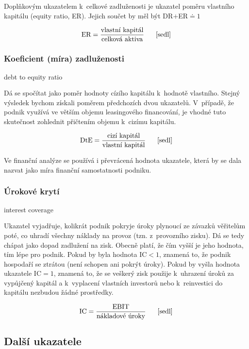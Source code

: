 \vspace{3mm}
Doplňkovým ukazatelem k~celkové zadluženosti je ukazatel poměru vlastního kapitálu (equity ratio, ER). Jejich součet by měl být DR$+$ER$
\doteq 1$

$$\vz{ER}{vlastní kapitál}{celková aktiva} \scite{sedl}$$

\subsubsection{Koeficient (míra) zadluženosti}
debt to equity ratio

Dá se spočítat jako poměr hodnoty cízího kapitálu k~hodnotě vlastního. Stejný výsledek bychom získali poměrem předchozích dvou ukazatelů. V~případě, že podnik využívá ve větším objemu leasingového financování, je vhodné tuto skutečnost zohlednit přičtením objemu k~cizímu kapitálu. 

$$\vz{DtE}{cizí kapitál}{vlastní kapitál} \scite{sedl}$$

\vspace{3mm}
Ve finanční analýze se používá i převrácená hodnota ukazatele, která by se dala nazvat jako míra finanční samostatnosti podniku.

\subsubsection{Úrokové krytí}
interest coverage

Ukazatel vyjadřuje, kolikrát podnik pokryje úroky plynoucí ze závazků věřitelům poté, co uhradí všechny náklady na provoz (tzn. z~provozního zisku). Dá se tedy chápat jako dopad zadlužení na zisk. Obecně platí, že čím vyšší je jeho hodnota, tím lépe pro podnik. Pokud by byla hodnota IC$<1$, znamená to, že podnik hospodaří se ztrátou (není schopen ani pokrýt úroky). Pokud by vyšla hodnota ukazatele IC$=1$, znamená to, že se veškerý zisk použije k~uhrazení úroků za vypůjčený kapitál a k~vyplacení vlastních investorů nebo k~reinvestici do kapitálu nezbudou žádné prostředky.

$$\vz{IC}{EBIT}{nákladové úroky} \scite{sedl}$$








\subsection{Další ukazatele}

